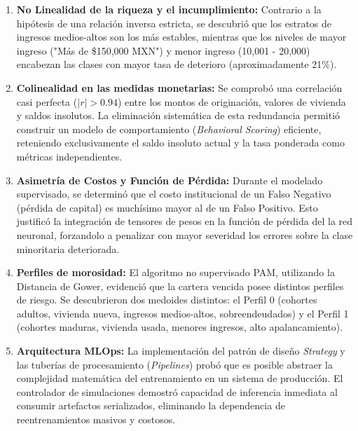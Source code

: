 \begin{enumerate}
	\item \textbf{No Linealidad de la riqueza y el incumplimiento:} Contrario a la hipótesis de una relación inversa estricta, se descubrió que los estratos de ingresos medios-altos son los más estables, mientras que los niveles de mayor ingreso ("Más de \$150,000 MXN") y menor ingreso (10,001 - 20,000) encabezan las clases con mayor tasa de deterioro (aproximadamente 21\%). 
	
	\item \textbf{Colinealidad en las medidas monetarias:} Se comprobó una correlación casi perfecta ($|r| > 0.94$) entre los montos de originación, valores de vivienda y saldos insolutos. La eliminación sistemática de esta redundancia permitió construir un modelo de comportamiento (\textit{Behavioral Scoring}) eficiente, reteniendo exclusivamente el saldo insoluto actual y la tasa ponderada como métricas independientes.
	
	\item \textbf{Asimetría de Costos y Función de Pérdida:} Durante el modelado supervisado, se determinó que el costo institucional de un Falso Negativo (pérdida de capital) es muchísimo mayor al de un Falso Positivo. Esto justificó la integración de tensores de pesos en la función de pérdida del la red neuronal, forzandolo a penalizar con mayor severidad los errores sobre la clase minoritaria deteriorada.
	
	\item \textbf{Perfiles de morosidad:} El algoritmo no supervisado PAM, utilizando la Distancia de Gower, evidenció que la cartera vencida posee distintos perfiles de riesgo. Se descubrieron dos medoides distintos: el Perfil 0 (cohortes adultos, vivienda nueva, ingresos medios-altos, sobreendeudados) y el Perfil 1 (cohortes maduras, vivienda usada, menores ingresos, alto apalancamiento).
	
	\item \textbf{Arquitectura MLOps:} La implementación del patrón de diseño \textit{Strategy} y las tuberías de procesamiento (\textit{Pipelines}) probó que es posible abstraer la complejidad matemática del entrenamiento en un sistema de producción. El controlador de simulaciones demostró capacidad de inferencia inmediata al consumir artefactos serializados, eliminando la dependencia de reentrenamientos masivos y costosos.
\end{enumerate}

